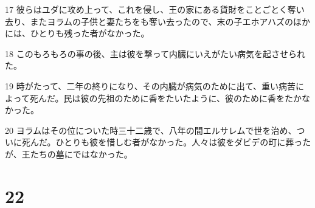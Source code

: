 \par 17 彼らはユダに攻め上って、これを侵し、王の家にある貨財をことごとく奪い去り、またヨラムの子供と妻たちをも奪い去ったので、末の子エホアハズのほかには、ひとりも残った者がなかった。
\par 18 このもろもろの事の後、主は彼を撃って内臓にいえがたい病気を起させられた。
\par 19 時がたって、二年の終りになり、その内臓が病気のために出て、重い病苦によって死んだ。民は彼の先祖のために香をたいたように、彼のために香をたかなかった。
\par 20 ヨラムはその位についた時三十二歳で、八年の間エルサレムで世を治め、ついに死んだ。ひとりも彼を惜しむ者がなかった。人々は彼をダビデの町に葬ったが、王たちの墓にではなかった。

\chapter{22}

